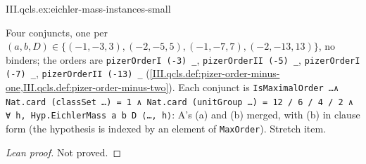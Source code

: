 \begin{example}[$D=3,5,7,13$; stretch]
\end{example}
\begin{tfformal}{III.qcls.ex:eichler-mass-instances-small}
\begin{tffidelity}
Four conjuncts, one per $(a,b,D)\in\{(-1,-3,3),(-2,-5,5),(-1,-7,7),(-2,-13,13)\}$, no binders; the orders are \texttt{pizerOrderI (-3) \_}, \texttt{pizerOrderII (-5) \_}, \texttt{pizerOrderI (-7) \_}, \texttt{pizerOrderII (-13) \_} (\cref{III.qcls.def:pizer-order-minus-one,III.qcls.def:pizer-order-minus-two}). Each conjunct is \texttt{IsMaximalOrder \dots ∧ Nat.card (classSet \dots) = 1 ∧ Nat.card (unitGroup \dots) = 12\,/\,6\,/\,4\,/\,2 ∧ ∀ h, Hyp.EichlerMass a b D ⟨\dots, h⟩}: A's (a) and (b) merged, with (b) in clause form (the hypothesis is indexed by an element of \texttt{MaxOrder}). Stretch item.
\end{tffidelity}
\end{tfformal}
\begin{proof}[Lean proof]
Not proved.
\end{proof}

